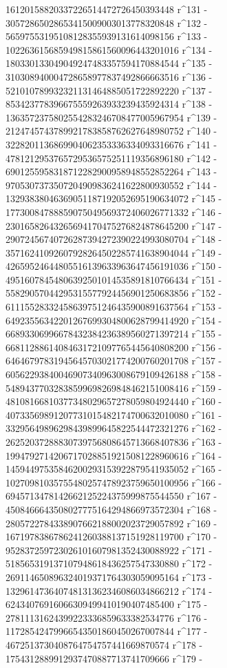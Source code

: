        16120158820337226514472726450393448 r^131 - 
       30572865028653415009003013778320848 r^132 - 
       56597553195108128355939131614098156 r^133 - 
       102263615685949815861560096443201016 r^134 - 
       180330133049049247483357594170884544 r^135 - 
       310308940004728658977837492866663516 r^136 - 
       521010789932321131464885051722892220 r^137 - 
       853423778396675559263933239435924314 r^138 - 
       1363572375802554283246708477005967954 r^139 - 
       2124745743789921783858762627648980752 r^140 - 
       3228201136869904062353336334093316676 r^141 - 
       4781212953765729536575251119356896180 r^142 - 
       6901255958318712282900958948552852264 r^143 - 
       9705307373507204909836241622800930552 r^144 - 
       13293838046369051187192052695190634072 r^145 - 
       17730084788859075049569372406026771332 r^146 - 
       23016582643265694170475276824878645200 r^147 - 
       29072456740726287394272390224993080704 r^148 - 
       35716241092607928264502285741638904044 r^149 - 
       42659524644805516139633963647456191036 r^150 - 
       49516078454806392501014535891810766434 r^151 - 
       55829057044295315577924456901250683856 r^152 - 
       61115528332458639751246435900891637564 r^153 - 
       64923556342201267699304800628799414920 r^154 - 
       66893306996678432384236389560271397214 r^155 - 
       66811288614084631721097765445640808200 r^156 - 
       64646797831945645703021774200760201708 r^157 - 
       60562293840046907340963008679109426188 r^158 - 
       54894377032838599698269848462151008416 r^159 - 
       48108166810377348029657278059804924440 r^160 - 
       40733569891207731015482174700632010080 r^161 - 
       33295649896298439899645822544472321276 r^162 - 
       26252037288830739756808645713668407836 r^163 - 
       19947927142067170288519215081228960616 r^164 - 
       14594497535846200293153922879541935052 r^165 - 
       10270981035755480257478923759650100956 r^166 - 
       6945713478142662125224375999875544550 r^167 - 
       4508466643508027775164294866973572304 r^168 - 
       2805722784338907662188002023729057892 r^169 - 
       1671978386786241260388137151928119700 r^170 - 
       952837259723026101607981352430088922 r^171 - 
       518565319137107948618436257547330880 r^172 - 
       269114650896324019371764303059095164 r^173 - 
       132961473640748131362346086034866212 r^174 - 
       62434076916066309499410190407485400 r^175 - 
       27811131624399223336859633382534776 r^176 - 
       11728542479966543501860450267007844 r^177 - 
       4672513730408764754757441669870574 r^178 - 
       1754312889912937470887713741709666 r^179 - 
